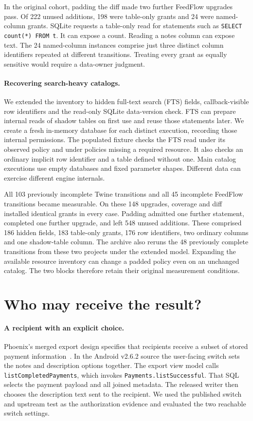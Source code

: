 \documentclass[11pt,a4paper]{article}
\newcommand{\code}[1]{\texttt{#1}}
\begin{document}
In the original cohort, padding the diff made two further FeedFlow upgrades pass. Of 222 unused additions, 198 were table-only grants and 24 were named-column grants. SQLite requests a table-only read for statements such as \code{SELECT count(*) FROM t}. It can expose a count. Reading a notes column can expose text. The 24 named-column instances comprise just three distinct column identifiers repeated at different transitions. Treating every grant as equally sensitive would require a data-owner judgment.

\paragraph{Recovering search-heavy catalogs.} We extended the inventory to hidden full-text search (FTS) fields, callback-visible row identifiers and the read-only SQLite data-version check. FTS can prepare internal reads of shadow tables on first use and reuse those statements later. We create a fresh in-memory database for each distinct execution, recording those internal permissions. The populated fixture checks the FTS read under its observed policy and under policies missing a required resource. It also checks an ordinary implicit row identifier and a table defined without one. Main catalog executions use empty databases and fixed parameter shapes. Different data can exercise different engine internals.

All 103 previously incomplete Twine transitions and all 45 incomplete FeedFlow transitions became measurable. On these 148 upgrades, coverage and diff installed identical grants in every case. Padding admitted one further statement, completed one further upgrade, and left 548 unused additions. These comprised 186 hidden fields, 183 table-only grants, 176 row identifiers, two ordinary columns and one shadow-table column. The archive also reruns the 48 previously complete transitions from these two projects under the extended model. Expanding the available resource inventory can change a padded policy even on an unchanged catalog. The two blocks therefore retain their original measurement conditions.

\newpage
\section{Who may receive the result?}
\paragraph{A recipient with an explicit choice.} Phoenix's merged export design specifies that recipients receive a subset of stored payment information~\cite{phoenix}. In the Android v2.6.2 source the user-facing switch sets the notes and description options together. The export view model calls \code{listCompletedPayments}, which invokes \code{Payments.listSuccessful}. That SQL selects the payment payload and all joined metadata. The released writer then chooses the description text sent to the recipient. We used the published switch and upstream test as the authorization evidence and evaluated the two reachable switch settings.
\end{document}
